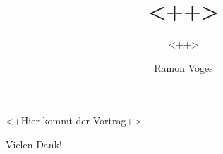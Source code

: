 \documentclass[DIV=calc, a4paper, fontsize=12pt, headings=normal, parskip=half]{scrartcl}
\begin{document}
\title{<++>}
\subtitle{<++>}
\subject{<++>}
\date{\normalsize <++>}
\author{\normalsize Ramon Voges}

\maketitle



<+Hier kommt der Vortrag+>

Vielen Dank!


\newpage
\begingroup \parindent 0pt

\def\enotesize{\footnotesize} \theendnotes
\endgroup
\end{document}
